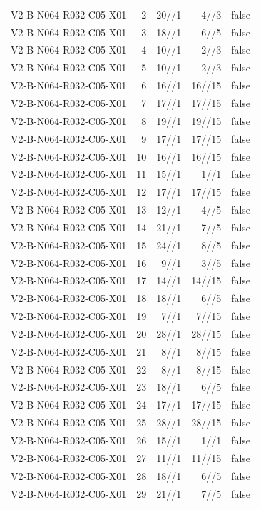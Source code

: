 {\begin{longtable}{lrrrr}
V2-B-N064-R032-C05-X01 & 2 & 20//1 & 4//3 & false \\
V2-B-N064-R032-C05-X01 & 3 & 18//1 & 6//5 & false \\
V2-B-N064-R032-C05-X01 & 4 & 10//1 & 2//3 & false \\
V2-B-N064-R032-C05-X01 & 5 & 10//1 & 2//3 & false \\
V2-B-N064-R032-C05-X01 & 6 & 16//1 & 16//15 & false \\
V2-B-N064-R032-C05-X01 & 7 & 17//1 & 17//15 & false \\
V2-B-N064-R032-C05-X01 & 8 & 19//1 & 19//15 & false \\
V2-B-N064-R032-C05-X01 & 9 & 17//1 & 17//15 & false \\
V2-B-N064-R032-C05-X01 & 10 & 16//1 & 16//15 & false \\
V2-B-N064-R032-C05-X01 & 11 & 15//1 & 1//1 & false \\
V2-B-N064-R032-C05-X01 & 12 & 17//1 & 17//15 & false \\
V2-B-N064-R032-C05-X01 & 13 & 12//1 & 4//5 & false \\
V2-B-N064-R032-C05-X01 & 14 & 21//1 & 7//5 & false \\
V2-B-N064-R032-C05-X01 & 15 & 24//1 & 8//5 & false \\
V2-B-N064-R032-C05-X01 & 16 & 9//1 & 3//5 & false \\
V2-B-N064-R032-C05-X01 & 17 & 14//1 & 14//15 & false \\
V2-B-N064-R032-C05-X01 & 18 & 18//1 & 6//5 & false \\
V2-B-N064-R032-C05-X01 & 19 & 7//1 & 7//15 & false \\
V2-B-N064-R032-C05-X01 & 20 & 28//1 & 28//15 & false \\
V2-B-N064-R032-C05-X01 & 21 & 8//1 & 8//15 & false \\
V2-B-N064-R032-C05-X01 & 22 & 8//1 & 8//15 & false \\
V2-B-N064-R032-C05-X01 & 23 & 18//1 & 6//5 & false \\
V2-B-N064-R032-C05-X01 & 24 & 17//1 & 17//15 & false \\
V2-B-N064-R032-C05-X01 & 25 & 28//1 & 28//15 & false \\
V2-B-N064-R032-C05-X01 & 26 & 15//1 & 1//1 & false \\
V2-B-N064-R032-C05-X01 & 27 & 11//1 & 11//15 & false \\
V2-B-N064-R032-C05-X01 & 28 & 18//1 & 6//5 & false \\
V2-B-N064-R032-C05-X01 & 29 & 21//1 & 7//5 & false \\

\end{longtable}}
